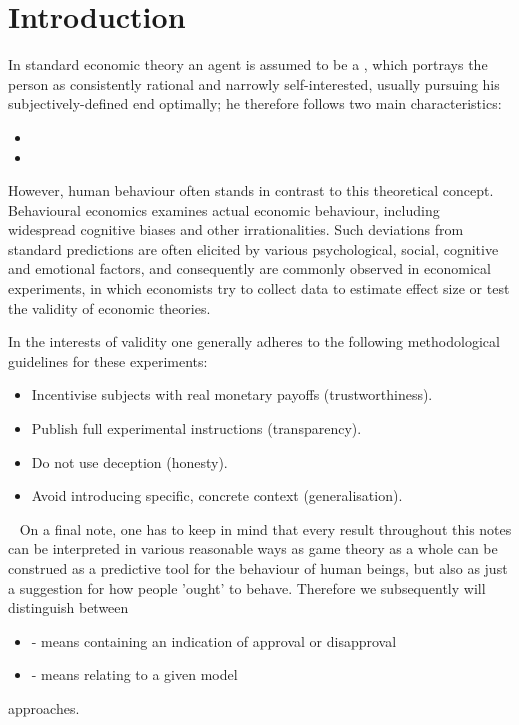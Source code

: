 \chapter*{Introduction} 


In standard economic theory an agent is assumed to be a , which portrays the person as consistently rational and narrowly self-interested, usually pursuing his subjectively-defined end optimally; he therefore follows two main characteristics:
\begin{itemize}
	\item {}
	\item {}
\end{itemize}

However, human behaviour often stands in contrast to this theoretical concept. Behavioural economics examines actual economic behaviour, including widespread cognitive biases and other irrationalities. Such deviations from standard predictions are often elicited by various psychological, social, cognitive and emotional factors, and consequently are commonly observed in economical experiments, in which economists try to collect data to estimate effect size or test the validity of economic theories.

	In the interests of validity one generally adheres to the following methodological guidelines for these experiments: 
	\begin{itemize}
		\item Incentivise subjects with real monetary payoffs (trustworthiness).
		\item Publish full experimental instructions (transparency).
		\item Do not use deception (honesty).
		\item Avoid introducing specific, concrete context (generalisation).
	\end{itemize}	
~\newline	
On a final note, one has to keep in mind that every result throughout this notes can be interpreted in various reasonable ways as game theory as a whole can be construed as a predictive tool for the behaviour of human beings, but also as just a suggestion for how people 'ought' to behave. Therefore we subsequently will distinguish between
\begin{itemize}
	\item {} - means containing an indication of approval or disapproval
	\item {} - means relating to a given model
\end{itemize}
approaches.